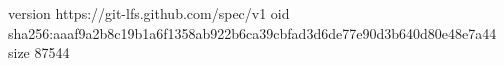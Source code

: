 version https://git-lfs.github.com/spec/v1
oid sha256:aaaf9a2b8c19b1a6f1358ab922b6ca39cbfad3d6de77e90d3b640d80e48e7a44
size 87544
